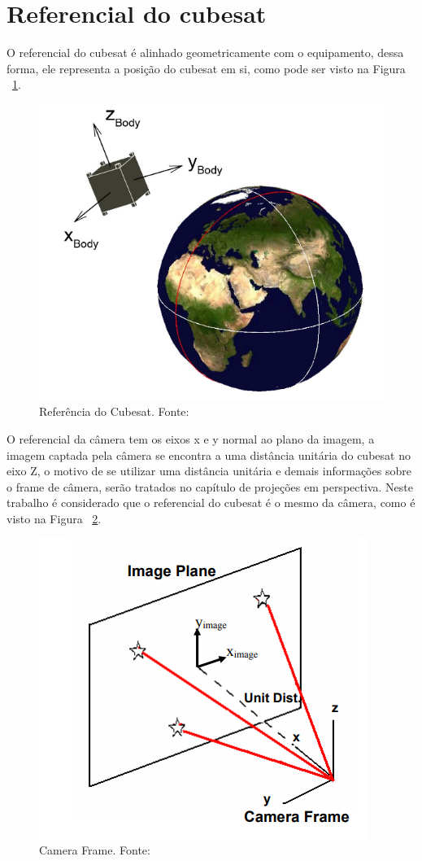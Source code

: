 \section{Referencial do cubesat}

O referencial do cubesat é alinhado geometricamente com o equipamento, dessa forma, ele representa a posição do cubesat em si, 
como pode ser visto na Figura ~\ref{fig:Referencia_do_Cubesat}.

\begin{figure}[H]
	\centering
	\includegraphics[width=.7\columnwidth]{images/Referencia_do_Cubesat.png}
	\caption{Referência do Cubesat. Fonte: ~\cite[]{Diaz}}
	\label{fig:Referencia_do_Cubesat}
\end{figure}

O referencial da câmera tem os eixos x e y normal ao plano da imagem, a imagem captada pela câmera se encontra a uma distância unitária do cubesat no eixo Z, o motivo de se utilizar uma distância unitária e demais informações sobre o frame de câmera, 
serão tratados no capítulo de projeções em perspectiva. Neste trabalho é considerado que o referencial do cubesat é o mesmo da câmera, como é visto na Figura ~\ref{fig:Camera_Frame}.

\begin{figure}[H]
	\centering
	\includegraphics[width=.7\columnwidth]{images/Camera_Frame.png}
	\caption{Camera Frame. Fonte: ~\cite[]{Diaz}}
	\label{fig:Camera_Frame}
\end{figure}